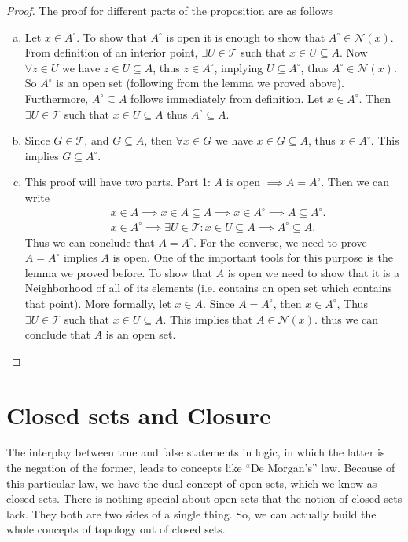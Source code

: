 \begin{proof}
	The proof for different parts of the proposition are as follows
	\begin{enumerate}[(a)]
		\item Let $x\in A^\circ$. To show that $A^\circ$ is open it is enough to show that $A^\circ \in \mathcal{N}(x)$. From definition of an interior point, $\exists U \in \mathcal{T}$ such that $x\in U \subseteq A$. Now $\forall z\in U$ we have $z\in U \subseteq A$, thus $z\in A^\circ$, implying $U\subseteq A^\circ$, thus $A^\circ \in \mathcal{N}(x)$. So $A^\circ$ is an open set (following from the lemma we proved above). Furthermore, $A^\circ \subseteq A$ follows immediately from definition. Let $x\in A^\circ$. Then $\exists U \in \mathcal{T}$ such that $x \in U \subseteq A$ thus $A^\circ \subseteq A$.
		\item Since $G \in \mathcal{T}$, and $G\subseteq A$, then $\forall x\in G$ we have $x\in G \subseteq A$, thus $x \in A^\circ$. This implies $G \subseteq A^\circ$.
		
		\item This proof will have two parts. Part 1: $A$ is open $\implies A = A^\circ$. Then we can write
		\begin{align*}
			& x \in A \implies x \in A \subseteq A \implies x \in A^\circ \implies A \subseteq A^\circ. \\
			& x \in A^\circ \implies \exists U \in \mathcal{T}: x \in U \subseteq A \implies A^\circ \subseteq A.
		\end{align*} 
		Thus we can conclude that $A = A^\circ$. For the converse, we need to prove $A=A^\circ$ implies $A$ is open. One of the important tools for this purpose is the lemma we proved before. To show that $A$ is open we need to show that it is a Neighborhood of all of its elements (i.e. contains an open set which contains that point). More formally, let $x\in A$. Since $A = A^\circ$, then $x \in A^\circ$, Thus $\exists U \in \mathcal{T}$ such that $x \in U \subseteq A$. This implies that $A \in \mathcal{N}(x)$. thus we can conclude that $A$ is an open set.
	\end{enumerate}
\end{proof}


\section{Closed sets and Closure}
The interplay between true and false statements in logic, in which the latter is the negation of the former, leads to concepts like ``De Morgan's'' law. Because of this particular law, we have the dual concept of open sets, which we know as closed sets. There is nothing special about open sets that the notion of closed sets lack. They both are two sides of a single thing. So, we can actually build the whole concepts of topology out of closed sets.


